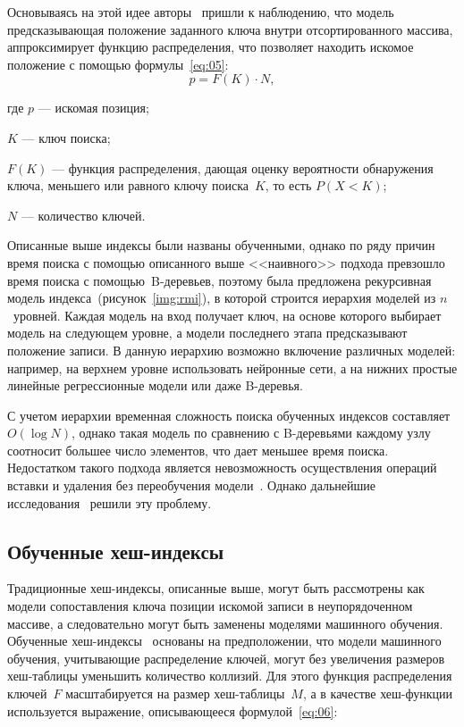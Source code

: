 Основываясь на этой идее авторы~\cite{main} пришли к наблюдению, что модель
предсказывающая положение заданного ключа внутри отсортированного массива,
аппроксимирует функцию распределения, что позволяет находить искомое положение с
помощью формулы~\eqref{eq:05}:
\begin{equation}\label{eq:05}
    p = F(K) \cdot N,
\end{equation}

где $p$ --- искомая позиция;

$K$ --- ключ поиска;

$F(K)$ --- функция распределения, дающая оценку вероятности обнаружения
ключа, меньшего или равного ключу поиска~$K$, то есть $P(X < K)$;

$N$ --- количество ключей.

Описанные выше индексы были названы обученными, однако по ряду
причин~\cite{main} время поиска с помощью описанного выше <<наивного>> подхода
превзошло время поиска с помощью~B-деревьев, поэтому была предложена рекурсивная
модель индекса~(рисунок~\ref{img:rmi}), в которой строится иерархия моделей из
$n$~уровней. Каждая модель на вход получает ключ, на основе которого выбирает
модель на следующем уровне, а модели последнего этапа предсказывают положение
записи. В данную иерархию возможно включение различных моделей: например, на
верхнем уровне использовать нейронные сети, а на нижних простые линейные
регрессионные модели или даже B-деревья. 


С учетом иерархии временная сложность поиска обученных индексов
составляет~$O(\log N)$, однако такая модель по сравнению с B-деревьями каждому
узлу соотносит большее число элементов, что дает меньшее время поиска.
Недостатком такого подхода является невозможность осуществления операций вставки
и удаления без переобучения модели~\cite{ulipp}. Однако дальнейшие
исследования~\cite{alex, apex, ulipp, pgmi} решили эту проблему.

\subsection{Обученные хеш-индексы}

Традиционные хеш-индексы, описанные выше, могут быть рассмотрены как модели
сопоставления ключа позиции искомой записи в неупорядоченном массиве, а
следовательно могут быть заменены моделями машинного обучения.  Обученные
хеш-индексы~\cite{main} основаны на предположении, что модели машинного
обучения, учитывающие распределение ключей, могут без увеличения размеров
хеш-таблицы уменьшить количество коллизий. Для этого функция распределения
ключей~$F$ масштабируется на размер хеш-таблицы~$M$, а в качестве хеш-функции
используется выражение, описывающееся формулой~\eqref{eq:06}:

